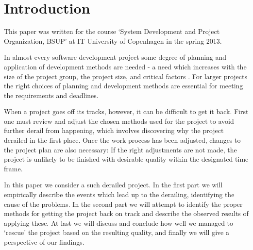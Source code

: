 \section{Introduction}
This paper was written for the course `System Development and Project Organization, BSUP' at IT-University of Copenhagen in the spring 2013.

In almost every software development project some degree of planning and application of development methods are needed - a need which increases with the size of the project group, the project size, and critical factors \cite[p. 134]{ac}. For larger projects the right choices of planning and development methods are essential for meeting the requirements and deadlines.

When a project goes off its tracks, however, it can be difficult to get it back. First one must review and adjust the chosen methods used for the project to avoid further derail from happening, which involves discovering why the project derailed in the first place.
Once the work process has been adjusted, changes to the project plan are also necessary: If the right adjustments are not made, the project is unlikely to be finished with desirable quality within the designated time frame.

In this paper we consider a such derailed project.
In the first part we will empirically describe the events which lead up to the derailing, identifying the cause of the problems. In the second part we will attempt to identify the proper methods for getting the project back on track and describe the observed results of applying these. At last we will discuss and conclude how well we managed to `rescue' the project based on the resulting quality, and finally we will give a perspective of our findings.
\newpage
